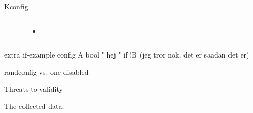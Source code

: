 \documentclass[mathserif,serif]{beamer}
\newenvironment{items}{
\begin{itemize}
  \setlength{\itemsep}{0pt}
  \setlength{\parskip}{7pt}
  \setlength{\parsep}{4pt}
}{\end{itemize}}
\begin{document}
\begin{frame}[t,fragile]{Kconfig}

    \begin{columns}[T]

    \begin{lstlisting}
    
    \end{lstlisting}


    \begin{items}
        \item
    \end{items}

    \end{columns}
\end{frame}

extra if-example
config A
    bool " hej " if !B
(jeg tror nok, det er saadan det er)

randconfig vs. one-disabled

Threats to validity

The collected data.
\end{document}
